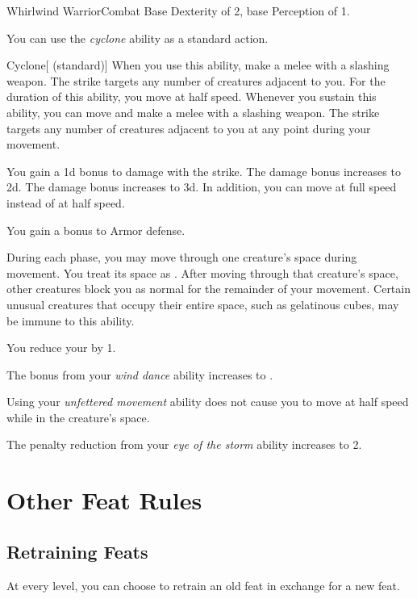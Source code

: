     \begin{feat}{Whirlwind Warrior}{Combat}
        \featpres Base Dexterity of 2, base Perception of 1.

         You can use the \textit{cyclone} ability as a standard action.
        \begin{freeability}{Cyclone}[ (standard)]
            When you use this ability, make a melee  with a slashing weapon.
            The strike targets any number of creatures adjacent to you.
            For the duration of this ability, you move at half speed.
            Whenever you sustain this ability, you can move and make a melee  with a slashing weapon.
            The strike targets any number of creatures adjacent to you at any point during your movement.

            \rankline
             You gain a \plus1d bonus to damage with the strike.
             The damage bonus increases to \plus2d.
             The damage bonus increases to \plus3d.
                In addition, you can move at full speed instead of at half speed.
        \end{freeability}

         You gain a  bonus to Armor defense.

         During each phase, you may move through one creature's space during movement.
        You treat its space as .
        After moving through that creature's space, other creatures block you as normal for the remainder of your movement.
        Certain unusual creatures that occupy their entire space, such as gelatinous cubes, may be immune to this ability.

         You reduce your  by 1.

         The bonus from your \textit{wind dance} ability increases to .

         Using your \textit{unfettered movement} ability does not cause you to move at half speed while in the creature's space.

         The penalty reduction from your \textit{eye of the storm} ability increases to 2.
    \end{feat}

\section{Other Feat Rules}

    \subsection{Retraining Feats}
        At every level, you can choose to retrain an old feat in exchange for a new feat.
